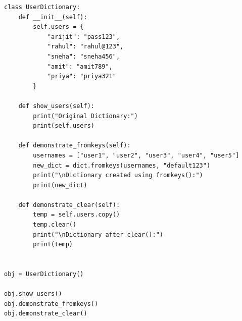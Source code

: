 \begin{verbatim}
class UserDictionary:
    def __init__(self):
        self.users = {
            "arijit": "pass123",
            "rahul": "rahul@123",
            "sneha": "sneha456",
            "amit": "amit789",
            "priya": "priya321"
        }

    def show_users(self):
        print("Original Dictionary:")
        print(self.users)

    def demonstrate_fromkeys(self):
        usernames = ["user1", "user2", "user3", "user4", "user5"]
        new_dict = dict.fromkeys(usernames, "default123")
        print("\nDictionary created using fromkeys():")
        print(new_dict)

    def demonstrate_clear(self):
        temp = self.users.copy()
        temp.clear()
        print("\nDictionary after clear():")
        print(temp)


obj = UserDictionary()

obj.show_users()
obj.demonstrate_fromkeys()
obj.demonstrate_clear()
\end{verbatim}